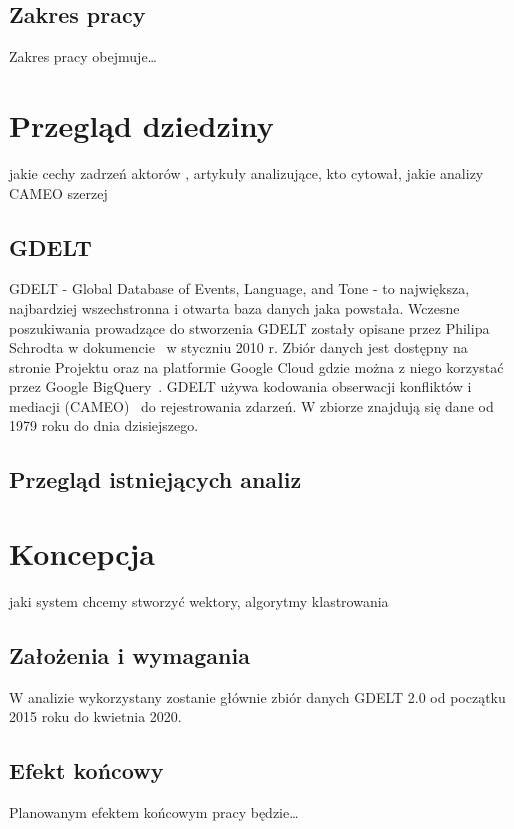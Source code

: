 \documentclass[11pt]{report}
\begin{document}
    \section{Zakres pracy}
    Zakres pracy obejmuje\ldots


    \chapter{Przegląd dziedziny}
    jakie cechy zadrzeń aktorów , artykuły analizujące, kto cytował, jakie analizy
    CAMEO szerzej


    \section{GDELT}
    GDELT - Global Database of Events, Language, and Tone - to największa, najbardziej wszechstronna i otwarta baza danych jaka powstała. Wczesne poszukiwania prowadzące do stworzenia GDELT zostały opisane przez Philipa Schrodta w dokumencie~\cite{Schrodt2010} w styczniu 2010 r. Zbiór danych jest dostępny na stronie Projektu oraz na platformie Google Cloud gdzie można z niego korzystać przez Google BigQuery~\cite{BigQuery2014}. GDELT używa kodowania obserwacji konfliktów i mediacji (CAMEO)~\cite{GDELTDocumentation} do rejestrowania zdarzeń. W zbiorze znajdują się dane od 1979 roku do dnia dzisiejszego.


    \section{Przegląd istniejących analiz} \label{ch:przeglad}


    \chapter{Koncepcja}
    jaki system chcemy stworzyć
    wektory, algorytmy klastrowania


    \section{Założenia i wymagania}
    W analizie wykorzystany zostanie głównie zbiór danych GDELT 2.0 od początku 2015 roku do kwietnia 2020.


    \section{Efekt końcowy}
    Planowanym efektem końcowym pracy będzie\ldots
\end{document}
